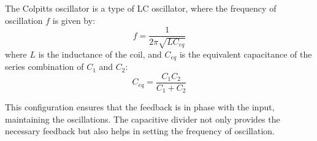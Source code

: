 The Colpitts oscillator is a type of LC oscillator, where the frequency of oscillation \(f\) is given by:
\[
f = \frac{1}{2\pi \sqrt{L C_{eq}}}
\]
where \(L\) is the inductance of the coil, and \(C_{eq}\) is the equivalent capacitance of the series combination of \(C_1\) and \(C_2\):
\[
C_{eq} = \frac{C_1 C_2}{C_1 + C_2}
\]

This configuration ensures that the feedback is in phase with the input, maintaining the oscillations. The capacitive divider not only provides the necessary feedback but also helps in setting the frequency of oscillation.

